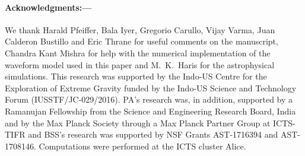 \documentclass[prl,preprintnumbers,twocolumn,eqsecnum,floatfix,a4paper,nofootinbib,superscriptaddress]{revtex4}
\begin{document}
\paragraph{Acknowledgments:---}
We thank Harald Pfeiffer, Bala Iyer, Gregorio Carullo, Vijay Varma, Juan Calderon Bustillo and Eric Thrane for useful comments on the manuscript, Chandra Kant Mishra for help with the numerical implementation of the waveform model used in this paper and M.~K.~Haris for the astrophysical simulations. This research was supported by the Indo-US Centre for the Exploration of Extreme Gravity funded by the Indo-US Science and Technology Forum (IUSSTF/JC-029/2016). PA's research was, in addition, supported by a Ramanujan Fellowship from the Science and Engineering Research Board, India and by the Max Planck Society through a Max Planck Partner Group at ICTS-TIFR and BSS's research was supported by NSF Grants AST-1716394 and AST-1708146. Computations were performed at the ICTS cluster Alice. 

%


\end{document}
